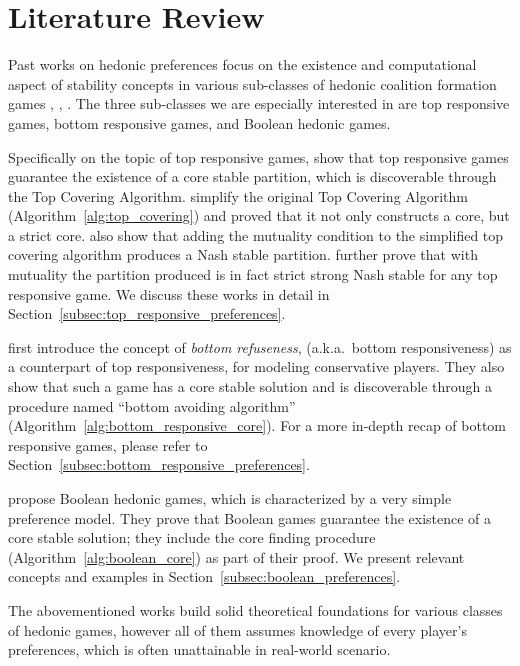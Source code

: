 \chapter{Literature Review}
\label{ch:review}

Past works on hedonic preferences focus on the existence and computational
aspect of stability concepts in various sub-classes of hedonic coalition
formation games
\cite{Aziz:2012:ESH:2343776.2343806}, \cite{aziz_savani_moulin_2016},
\cite{Aziz:2016:BHG:3032027.3032048}.
The three sub-classes we are especially interested in are top responsive games,
bottom responsive games, and Boolean hedonic games.

Specifically on the topic of top responsive games,
 show that top responsive games guarantee the
existence of a core stable partition, which is discoverable through the Top
Covering Algorithm.
 simplify the original Top Covering Algorithm
(Algorithm~\ref{alg:top_covering}) and proved that it not only constructs a
core, but a strict core.
 also show that adding the mutuality condition
to the simplified top covering algorithm produces a Nash stable partition.
 further prove that with mutuality
the partition produced is in fact strict strong Nash stable for any top
responsive game.
We discuss these works in detail in
Section~\ref{subsec:top_responsive_preferences}.

 first introduce the concept of \textit{bottom refuseness},
(a.k.a.\ bottom responsiveness) as a counterpart of top responsiveness, for
modeling conservative players.
They also show that such a game has a core stable solution and is discoverable
through a procedure named ``bottom avoiding algorithm''
(Algorithm~\ref{alg:bottom_responsive_core}).
For a more in-depth recap of bottom responsive games, please refer to
Section~\ref{subsec:bottom_responsive_preferences}.

 propose Boolean hedonic games,
which is characterized by a very simple preference model.
They prove that Boolean games guarantee the existence of a core stable solution;
they include the core finding procedure (Algorithm~\ref{alg:boolean_core}) as
part of their proof.
We present relevant concepts and examples in
Section~\ref{subsec:boolean_preferences}.

The abovementioned works build solid theoretical foundations for various
classes of hedonic games, however all of them assumes knowledge of every
player's preferences, which is often unattainable in real-world scenario.

